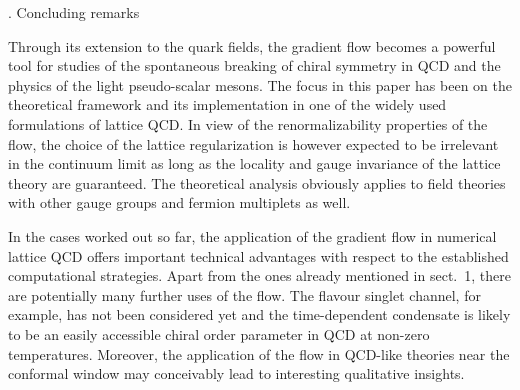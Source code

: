 
. Concluding remarks

Through its extension to the quark fields,
the gradient flow becomes a powerful tool for 
studies of the spontaneous breaking of chiral symmetry in QCD
and the physics of the light pseudo-scalar mesons.
The focus in this paper has been on
the theoretical framework and its implementation in 
one of the widely used formulations of lattice QCD. 
In view of the renormalizability properties of the flow,
the choice of the lattice regularization is however expected to be
irrelevant in the continuum limit
as long as the locality and gauge invariance 
of the lattice theory are guaranteed.
The theoretical analysis obviously applies to 
field theories
with other gauge groups and fermion multiplets as well.

In the cases worked out so far,
the application of the gradient flow in numerical lattice QCD
offers important technical advantages 
with respect to the established computational strategies. 
Apart from the ones already mentioned in sect.~1, 
there are potentially many further uses of the flow.
The flavour singlet channel, for example,
has not been considered yet and the time-dependent condensate
is likely to be an easily accessible chiral
order parameter in QCD at non-zero temperatures.
Moreover, the application of the 
flow in QCD-like theories near the conformal window may 
conceivably lead to interesting qualitative insights.

